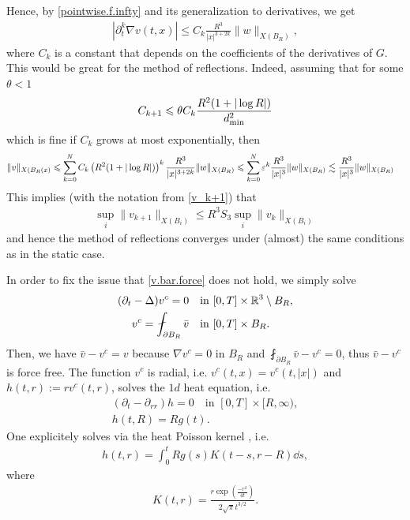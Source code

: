 \documentclass[abstracton, paper=a4, fontsize=11pt,DIV=12,bibliography=totoc]{scrartcl}
\begin{document}
Hence, by \eqref{pointwise.f.infty} and its generalization to derivatives, we get
\begin{align*}
    |\partial_t^k \nabla v(t,x)| \leq C_k \frac{R^3}{|x|^{3+2k}} \|w\|_{X(B_R)},
\end{align*}
where $C_k$ is a constant that depends on the coefficients of the derivatives of $G$.
This would be great for the method of reflections. Indeed, assuming that for some  $\theta < 1$
\begin{align*}
     C_{k+1} \leqslant \theta C_k  \frac{R^{2} (1+ |\log R|)}{d_{\mathrm{min}}^2} 
\end{align*}
which is fine if $C_k$ grows at most exponentially, then
\begin{align*}
     \|v\|_{X(B_R(x)} \leqslant  \sum_{k=0}^N C_k \left(R^{2} (1+ |\log R|)\right)^{k}  \frac{R^3}{|x|^{3+2k}} \|w\|_{X(B_R)}
     & \leqslant  \sum_{k=0}^N \varepsilon^k \frac{R^3}{|x|^{3}} \|w\|_{X(B_R)} \lesssim \frac{R^3}{|x|^{3}} \|w\|_{X(B_R)}
\end{align*}
This implies (with the notation from \eqref{v_k+1})
that
\begin{align*}
    \sup_{i} \|v_{k+1}\|_{X(B_i)} \leq R^3 S_3  \sup_{i} \|v_{k}\|_{X(B_i)}
\end{align*}
and hence the method of reflections converges under (almost) the same conditions as in the static case.

In order to fix the issue that \eqref{v.bar.force} does not hold, we simply solve
\begin{align*}
    (\partial_t - \Delta)v^c = 0 &\quad \text{in } [0,T] \times \R^3 \setminus B_R, \\
    v^c = \fint_{\partial B_R} \bar v  &\quad \text{in } [0,T] \times B_R.
\end{align*}
Then, we have $\bar v - v^c = v$ because     $\nabla v^c = 0 $ in $B_R$ and $\fint_{\partial B_R} \bar v - v^c = 0$, thus $\bar v - v^c$ is force free.
The function $v^c$ is radial, i.e. $v^c(t,x) = v^c(t,|x|)$ and $h(t,r) := r v^c(t,r)$, solves the $1d$ heat equation, i.e.
\begin{align*}
    (\partial_t - \partial_{rr}) h = 0 \quad \text{in } [0,T] \times [R,\infty), \\
    h(t,R) = Rg(t).
\end{align*}
One explicitely solves via the heat Poisson kernel , i.e.
\begin{align*}
    h(t,r) = \int_0^t R g(s) K(t-s,r-R) \dd s, 
\end{align*}
where 
\begin{align}
    K(t,r) = \frac{r\exp(\frac{-r^2}{4t})}{2 \sqrt \pi t^{3/2}}.
\end{align}
\end{document}
